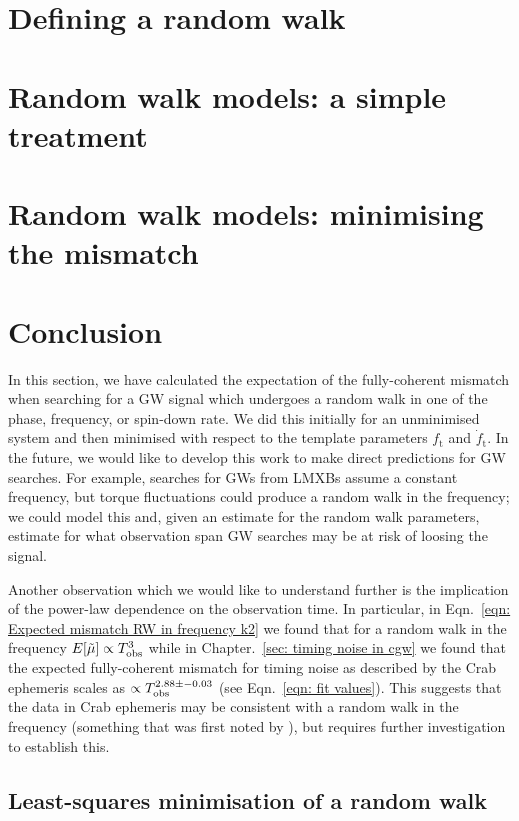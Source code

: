\documentclass[../full_thesis/full_thesis.tex]{subfiles}
\newcommand{\thisdir}{../analytic_timing_noise_cgw}
\begin{document}
\section{Defining a random walk}
\label{sec: Defining a random walk}


\section{Random walk models: a simple treatment}
\label{sec: random walk models part I}


\section{Random walk models: minimising the mismatch} 
\label{sec: random walk models part II}


\section{Conclusion}

In this section, we have calculated the expectation of the fully-coherent
mismatch when searching for a GW signal which undergoes a random walk in one of
the phase, frequency, or spin-down rate. We did this initially for an
unminimised system and then minimised with respect to the template parameters
$f_\textrm{t}$ and $\dot{f}_\textrm{t}$. In the future, we would like to develop
this work to make direct predictions for GW searches. For example,
searches for GWs from LMXBs assume a constant frequency, but torque fluctuations
could produce a random walk in the frequency; we could model this and, given
an estimate for the random walk parameters, estimate for what observation span
GW searches may be at risk of loosing the signal.

Another observation which we would like to understand further is the
implication of the power-law dependence on the observation time. In particular,
in Eqn.~\eqref{eqn: Expected mismatch RW in frequency k2} we found that for
a random walk in the frequency
$E[\tilde{\mu}] \propto T_{\mathrm{obs}} ^{3}$ while in Chapter.~\ref{sec: timing noise in
cgw} we found that the expected fully-coherent mismatch for timing noise as
described by the Crab ephemeris scales as $\propto T_{\mathrm{obs}}^{2.88\pm-0.03}$ (see
Eqn.~\eqref{eqn: fit values}). This suggests that the data in Crab ephemeris
may be consistent with a random walk in the frequency (something that was
first noted by \citet{Boynton1972}), but requires further investigation to
establish this.


\begin{subappendices}


\section{Least-squares minimisation of a random walk}
\label{sec: least squares minimisation of a random walk}



\end{subappendices}


\biblio
\end{document}
